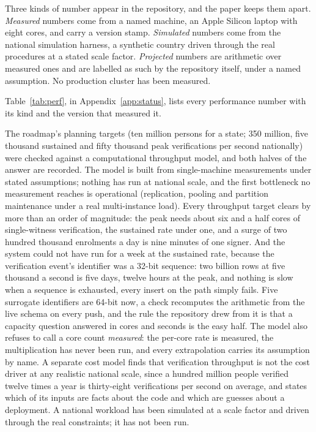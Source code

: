 Three kinds of number appear in the repository, and the paper keeps them apart. \emph{Measured}
numbers come from a named machine, an Apple Silicon laptop with eight cores, and carry a version
stamp. \emph{Simulated} numbers come from the national simulation harness, a synthetic country
driven through the real procedures at a stated scale factor. \emph{Projected} numbers are arithmetic
over measured ones and are labelled as such by the repository itself, under a named assumption. No
production cluster has been measured.

Table~\ref{tab:perf}, in Appendix~\ref{app:status}, lists every performance number with its kind and
the version that measured it.


The roadmap's planning targets (ten million persons for a state; 350 million, five thousand
sustained and fifty thousand peak verifications per second nationally) were checked
against a computational throughput model, and both halves of the answer are recorded.
The model is built from single-machine measurements under stated assumptions; nothing has run at
national scale, and the first bottleneck no measurement reaches is operational (replication,
pooling and partition maintenance under a real multi-instance load). Every throughput target clears by more
than an order of magnitude: the peak needs about six and a half cores of single-witness
verification, the sustained rate under one, and a surge of two hundred thousand enrolments a day is
nine minutes of one signer. And the system could not have run for a week at the sustained rate,
because the verification event's identifier was a 32-bit sequence: two billion rows at five thousand
a second is five days, twelve hours at the peak, and nothing is slow when a sequence is exhausted,
every insert on the path simply fails. Five surrogate identifiers are 64-bit now, a check recomputes
the arithmetic from the live schema on every push, and the rule the repository drew from it is that a
capacity question answered in cores and seconds is the easy half. The model also refuses to call a
core count \emph{measured}: the per-core rate is measured, the multiplication has never been run, and
every extrapolation carries its assumption by name. A separate cost model
finds that verification throughput is not the cost driver at any realistic national scale, since a
hundred million people verified twelve times a year is thirty-eight verifications per second on
average, and states which of its inputs are facts about the code and which are guesses about a
deployment. A national workload has been simulated at a scale factor and driven through the real
constraints; it has not been run. \sExp

